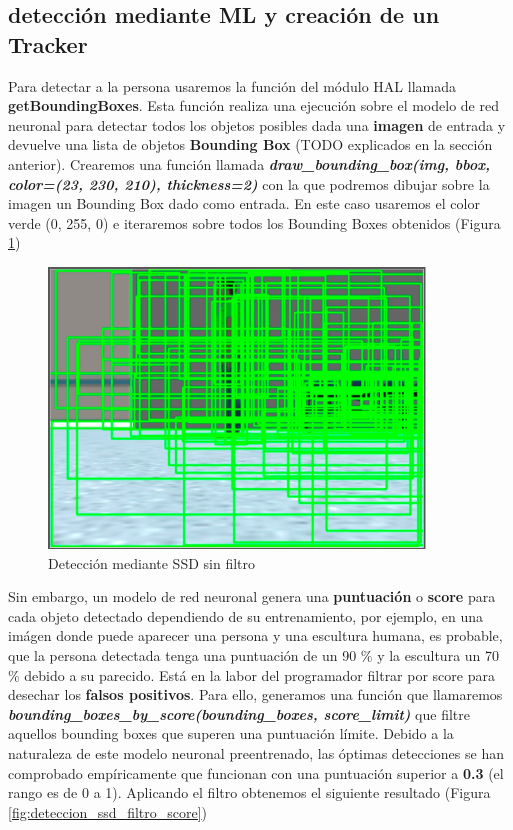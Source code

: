 \subsection{detección mediante ML y creación de un Tracker}
\label{subsec:ml_tracker}
Para detectar a la persona usaremos la función del módulo HAL llamada \textbf{getBoundingBoxes}. Esta función realiza una ejecución sobre el modelo de red neuronal para detectar todos los objetos posibles dada una \textbf{imagen} de entrada y devuelve una lista de objetos \textbf{Bounding Box} (TODO explicados en la sección anterior). Crearemos una función llamada \textbf{\textit{draw\_bounding\_box(img, bbox, color=(23, 230, 210), thickness=2)}} con la que podremos dibujar sobre la imagen un Bounding Box dado como entrada. En este caso usaremos el color verde (0, 255, 0) e iteraremos sobre todos los Bounding Boxes obtenidos (Figura \ref{fig:deteccion_ssd_sin_filtro})\\

\begin{figure} [H]
  \begin{center}
    \includegraphics[width=10cm]{imagenes/deteccion-ssd-sin-filtro.png}
  \end{center}
  \caption[Detección mediante SSD sin filtro]{Detección mediante SSD sin filtro}
  \label{fig:deteccion_ssd_sin_filtro}
\end{figure}

Sin embargo, un modelo de red neuronal genera una \textbf{puntuación} o \textbf{score} para cada objeto detectado dependiendo de su entrenamiento, por ejemplo, en una imágen donde puede aparecer una persona y una escultura humana, es probable, que la persona detectada tenga una puntuación de un 90 \% y la escultura un 70 \% debido a su parecido. Está en la labor del programador filtrar por score para desechar los \textbf{falsos positivos}. Para ello, generamos una función que llamaremos \textbf{\textit{bounding\_boxes\_by\_score(bounding\_boxes, score\_limit)}} que filtre aquellos bounding boxes que superen una puntuación límite. Debido a la naturaleza de este modelo neuronal preentrenado, las óptimas detecciones se han comprobado empíricamente que funcionan con una puntuación superior a \textbf{0.3} (el rango es de 0 a 1). Aplicando el filtro obtenemos el siguiente resultado (Figura \ref{fig:deteccion_ssd_filtro_score})\\

